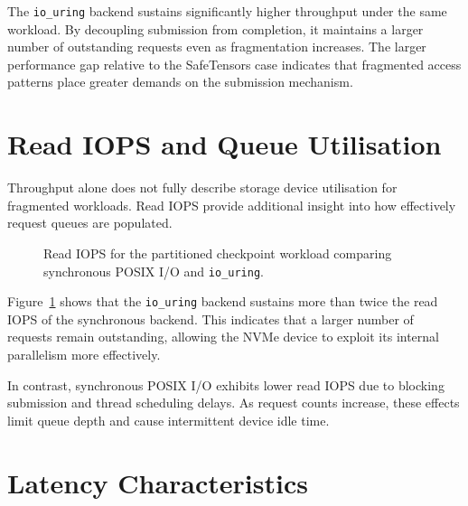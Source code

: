 \documentclass[]{final_report}
\begin{document}
The \texttt{io\_uring} backend sustains significantly higher throughput under the same workload. By decoupling submission from completion, it maintains a larger number of outstanding requests even as fragmentation increases. The larger performance gap relative to the SafeTensors case indicates that fragmented access patterns place greater demands on the submission mechanism.

\section{Read IOPS and Queue Utilisation}

Throughput alone does not fully describe storage device utilisation for fragmented workloads. Read IOPS provide additional insight into how effectively request queues are populated.

\begin{figure}[h]
\centering
{}
\caption{Read IOPS for the partitioned checkpoint workload comparing synchronous POSIX I/O and \texttt{io\_uring}.}
\label{fig:sllm-iops-mistral-eval}
\end{figure}

Figure~\ref{fig:sllm-iops-mistral-eval} shows that the \texttt{io\_uring} backend sustains more than twice the read IOPS of the synchronous backend. This indicates that a larger number of requests remain outstanding, allowing the NVMe device to exploit its internal parallelism more effectively.

In contrast, synchronous POSIX I/O exhibits lower read IOPS due to blocking submission and thread scheduling delays. As request counts increase, these effects limit queue depth and cause intermittent device idle time.

\section{Latency Characteristics}
\end{document}
